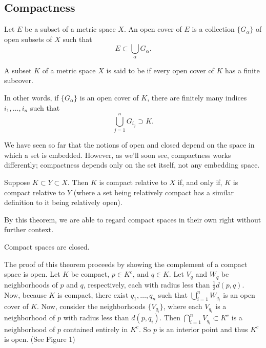 \documentclass{article}
\begin{document}
\subsection{Compactness}
\begin{definition}
    Let $E$ be a subset of a metric space $X$. An open cover of $E$ is a collection $\{G_{\alpha}\}$ of open subsets of $X$ such that \[E\subset \bigcup_{\alpha}G_{\alpha}.\]
\end{definition}
\begin{definition}
    A subset $K$ of a metric space $X$ is said to be  if every open cover of $K$ has a finite subcover. 
    
    In other words, if $\{G_{\alpha}\}$ is an open cover of $K$, there are finitely many indices $i_{1},\dotsc,i_{n}$ such that \[\bigcup_{j=1}^{n}G_{i_{j}} \supset K.\]
\end{definition}
We have seen so far that the notions of open and closed depend on the space in which a set is embedded. However, as we'll soon see, compactness works differently; compactness depends only on the set itself, not any embedding space.
\begin{theorem}
    Suppose $K\subset Y\subset X$. Then $K$ is compact relative to $X$ if, and only if, $K$ is compact relative to $Y$ (where a set being relatively compact has a similar definition to it being relatively open).
\end{theorem}
\begin{remark}
    By this theorem, we are able to regard compact spaces in their own right without further context.
\end{remark}
\begin{theorem}
    Compact spaces are closed.
\end{theorem}
\begin{remark}
    The proof of this theorem proceeds by showing the complement of a compact space is open. Let $K$ be compact, $p\in K^{c}$, and $q\in K$. Let $V_{q}$ and $W_{q}$ be neighborhoods of $p$ and $q$, respectively, each with radius less than $\frac{1}{2}d(p,q)$. Now, because $K$ is compact, there exist $q_{1},\dotsc,q_{n}$ such that $\bigcup_{i=1}^{n}W_{q_{i}}$ is an open cover of $K$. Now, consider the neighborhoods $\{V_{q_{i}}\}$, where each $V_{q_{i}}$ is a neighborhood of $p$ with radius less than $d(p,q_{i})$. Then $\bigcap_{i=1}^{n}V_{q_{i}}\subset K^{c}$ is a neighborhood of $p$ contained entirely in $K^{c}$. So $p$ is an interior point and thus $K^{c}$ is open. (See Figure 1)   
\end{remark}
\end{document}
